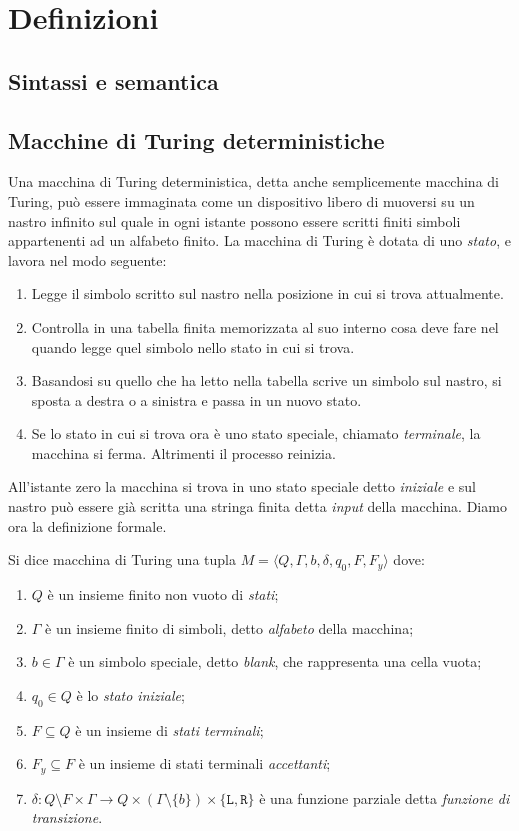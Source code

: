 \chapter{Definizioni}

\section{Sintassi e semantica}

\section{Macchine di Turing deterministiche}
Una macchina di Turing deterministica, detta anche semplicemente macchina di
Turing, può essere immaginata come un dispositivo libero di
muoversi su un nastro infinito sul quale in ogni istante possono essere scritti
finiti simboli appartenenti ad un alfabeto finito. La macchina di Turing è
dotata di uno \emph{stato}, e lavora nel modo seguente:
\begin{enumerate}
 \item Legge il simbolo scritto sul nastro nella posizione in cui si trova attualmente.
 \item Controlla in una tabella finita memorizzata al suo interno cosa deve fare
 nel quando legge quel simbolo nello stato in cui si trova.
 \item Basandosi su quello che ha letto nella tabella scrive un simbolo sul nastro,
 si sposta a destra o a sinistra e passa in un nuovo stato.
 \item Se lo stato in cui si trova ora è uno stato speciale, chiamato \emph{terminale},
 la macchina si ferma. Altrimenti il processo reinizia.
\end{enumerate}
All'istante zero la macchina si trova in uno stato speciale detto \emph{iniziale}
e sul nastro può essere già scritta una stringa finita detta \emph{input} della macchina.
Diamo ora la definizione formale.
\begin{definizione}
Si dice macchina di Turing una tupla
$M=\langle Q, \Gamma, b, \delta, q_0, F, F_y \rangle$ dove:
\begin{enumerate}
 \item $Q$ è un insieme finito non vuoto di \emph{stati};
 \item $\Gamma$ è un insieme finito di simboli, detto \emph{alfabeto} della macchina;
 \item $b \in \Gamma$ è un simbolo speciale, detto \emph{blank}, che rappresenta
 una cella vuota;
 \item $q_0 \in Q$ è lo \emph{stato iniziale};
 \item $F \subseteq Q$ è un insieme di \emph{stati terminali};
 \item $F_y \subseteq F$ è un insieme di stati terminali \emph{accettanti};
 \item $\delta: {Q \setminus F} \times \Gamma \to Q \times (\Gamma \setminus \{b\}) \times \{\texttt{L},\texttt{R}\}$
 è una funzione parziale detta \emph{funzione di transizione}.
\end{enumerate}
\end{definizione}

